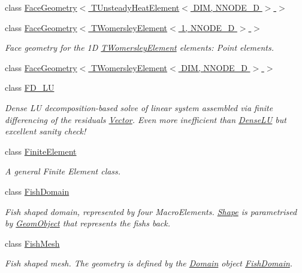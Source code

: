 \begin{DoxyCompactItemize}
class \hyperlink{classoomph_1_1FaceGeometry_3_01TUnsteadyHeatElement_3_01DIM_00_01NNODE__1D_01_4_01_4}{Face\+Geometry$<$ T\+Unsteady\+Heat\+Element$<$ D\+I\+M, N\+N\+O\+D\+E\+\_\+D $>$ $>$}
\item 
class \hyperlink{classoomph_1_1FaceGeometry_3_01TWomersleyElement_3_011_00_01NNODE__1D_01_4_01_4}{Face\+Geometry$<$ T\+Womersley\+Element$<$ 1, N\+N\+O\+D\+E\+\_\+D $>$ $>$}
\begin{DoxyCompactList}\small\item\em Face geometry for the 1D \hyperlink{classoomph_1_1TWomersleyElement}{T\+Womersley\+Element} elements\+: Point elements. \end{DoxyCompactList}\item 
class \hyperlink{classoomph_1_1FaceGeometry_3_01TWomersleyElement_3_01DIM_00_01NNODE__1D_01_4_01_4}{Face\+Geometry$<$ T\+Womersley\+Element$<$ D\+I\+M, N\+N\+O\+D\+E\+\_\+D $>$ $>$}
\item 
class \hyperlink{classoomph_1_1FD__LU}{F\+D\+\_\+\+LU}
\begin{DoxyCompactList}\small\item\em Dense LU decomposition-\/based solve of linear system assembled via finite differencing of the residuals \hyperlink{classoomph_1_1Vector}{Vector}. Even more inefficient than \hyperlink{classoomph_1_1DenseLU}{Dense\+LU} but excellent sanity check! \end{DoxyCompactList}\item 
class \hyperlink{classoomph_1_1FiniteElement}{Finite\+Element}
\begin{DoxyCompactList}\small\item\em A general Finite Element class. \end{DoxyCompactList}\item 
class \hyperlink{classoomph_1_1FishDomain}{Fish\+Domain}
\begin{DoxyCompactList}\small\item\em Fish shaped domain, represented by four Macro\+Elements. \hyperlink{classoomph_1_1Shape}{Shape} is parametrised by \hyperlink{classoomph_1_1GeomObject}{Geom\+Object} that represents the fish\textquotesingle{}s back. \end{DoxyCompactList}\item 
class \hyperlink{classoomph_1_1FishMesh}{Fish\+Mesh}
\begin{DoxyCompactList}\small\item\em Fish shaped mesh. The geometry is defined by the \hyperlink{classoomph_1_1Domain}{Domain} object \hyperlink{classoomph_1_1FishDomain}{Fish\+Domain}. \end{DoxyCompactList}\item 

\end{DoxyCompactItemize}
